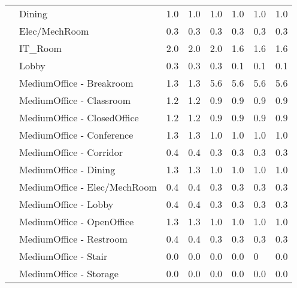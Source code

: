 \begin{center}
\begin{longtable}{p{1.25in}p{1in}p{0.5in}p{0.5in}p{0.5in}p{0.5in}p{0.5in}p{0.5in}}
                                   & Dining                               & 1.0     & 1.0     & 1.0    & 1.0   & 1.0   & 1.0    \\
                                   & Elec/MechRoom                        & 0.3     & 0.3     & 0.3    & 0.3   & 0.3   & 0.3    \\
                                   & IT\_Room                             & 2.0     & 2.0     & 2.0    & 1.6   & 1.6   & 1.6    \\
                                   & Lobby                                & 0.3     & 0.3     & 0.3    & 0.1   & 0.1   & 0.1    \\
                                   & MediumOffice - Breakroom             & 1.3     & 1.3     & 5.6    & 5.6   & 5.6   & 5.6    \\
                                   & MediumOffice - Classroom             & 1.2     & 1.2     & 0.9    & 0.9   & 0.9   & 0.9    \\
                                   & MediumOffice - ClosedOffice          & 1.2     & 1.2     & 0.9    & 0.9   & 0.9   & 0.9    \\
                                   & MediumOffice - Conference            & 1.3     & 1.3     & 1.0    & 1.0   & 1.0   & 1.0    \\
                                   & MediumOffice - Corridor              & 0.4     & 0.4     & 0.3    & 0.3   & 0.3   & 0.3    \\
                                   & MediumOffice - Dining                & 1.3     & 1.3     & 1.0    & 1.0   & 1.0   & 1.0    \\
                                   & MediumOffice - Elec/MechRoom         & 0.4     & 0.4     & 0.3    & 0.3   & 0.3   & 0.3    \\
                                   & MediumOffice - Lobby                 & 0.4     & 0.4     & 0.3    & 0.3   & 0.3   & 0.3    \\
                                   & MediumOffice - OpenOffice            & 1.3     & 1.3     & 1.0    & 1.0   & 1.0   & 1.0    \\
                                   & MediumOffice - Restroom              & 0.4     & 0.4     & 0.3    & 0.3   & 0.3   & 0.3    \\
                                   & MediumOffice - Stair                 & 0.0     & 0.0     & 0.0    & 0.0   & 0     & 0.0    \\
                                   & MediumOffice - Storage               & 0.0     & 0.0     & 0.0    & 0.0   & 0.0   & 0.0    \\

\end{longtable}
\end{center}
